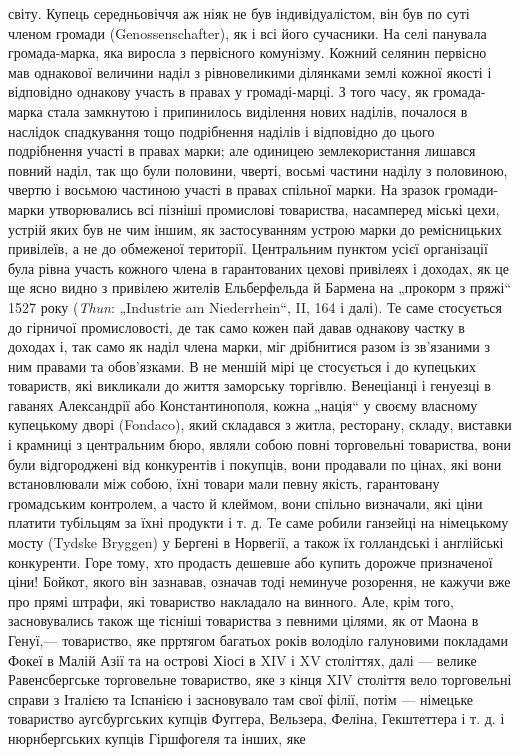 \parcont{}  %
світу. Купець середньовіччя аж ніяк не був індивідуалістом, він був по суті членом громади (Genossenschafter), як і всі його
сучасники. На селі панувала громада-марка, яка виросла з первісного комунізму. Кожний селянин первісно мав однакової
величини наділ з рівновеликими ділянками землі кожної якості і відповідно однакову участь в правах у громаді-марці. З того
часу, як громада-марка стала замкнутою і припинилось виділення нових наділів, почалося в наслідок спадкування тощо
подрібнення наділів і відповідно до цього подрібнення участі в правах марки; але одиницею землекористання лишався повний
наділ, так що були половини, чверті, восьмі частини наділу з половиною, чвертю і восьмою частиною участі в правах спільної
марки. На зразок громади-марки утворювались всі пізніші промислові товариства, насамперед міські цехи, устрій
яких був не чим іншим, як застосуванням устрою марки до ремісницьких привілеїв, а не до обмеженої території. Центральним
пунктом усієї організації була рівна участь кожного члена в гарантованих цехові привілеях і доходах, як це ще ясно видно з
привілею жителів Ельберфельда й Бармена на „прокорм з пряжі“ 1527 року (\emph{Thun}: „Industrie am Niederrhein“,  II, 164 і далі).
Те саме стосується до гірничої промисловості, де так само кожен пай давав однакову частку в доходах і, так само як наділ
члена марки, міг дрібнитися разом із зв’язаними з ним правами та обов’язками. В не меншій мірі це стосується і до купецьких
товариств, які викликали до життя заморську торгівлю. Венеціанці і генуезці в гаванях Александрії або Константинополя, кожна
„нація“ у своєму власному купецькому дворі (Fondaco), який складався з житла, ресторану, складу, виставки і крамниці з
центральним бюро, являли собою повні торговельні товариства, вони були відгороджені від конкурентів і покупців, вони
продавали по цінах, які вони встановлювали між собою, їхні товари мали певну якість, гарантовану громадським контролем, а
часто й клеймом, вони спільно визначали, які ціни платити тубільцям за їхні продукти і т. д. Те саме робили ганзейці на
німецькому мосту (Tydske Bryggen) у Бергені в Норвегії, а також їх голландські і англійські конкуренти. Горе тому, хто
продасть дешевше або купить дорожче призначеної ціни! Бойкот, якого він зазнавав, означав тоді неминуче розорення, не кажучи
вже про прямі штрафи, які товариство накладало на винного. Але, крім того, засновувались також ще тісніші товариства з
певними цілями, як от Маона в Генуї,—  товариство, яке прртягом багатьох років володіло галуновими покладами Фокеї в Малій
Азії та на острові Хіосі в XIV і XV  століттях, далі — велике Равенсбергське торговельне товариство, яке з кінця XIV
століття вело торговельні справи з Італією та Іспанією і засновувало там свої філії, потім — німецьке товариство
аугсбургських купців Фуггера, Вельзера, Феліна, Гекштеттера і т. д. і нюрнбергських купців Гіршфогеля та інших, яке
\parbreak{}  %
